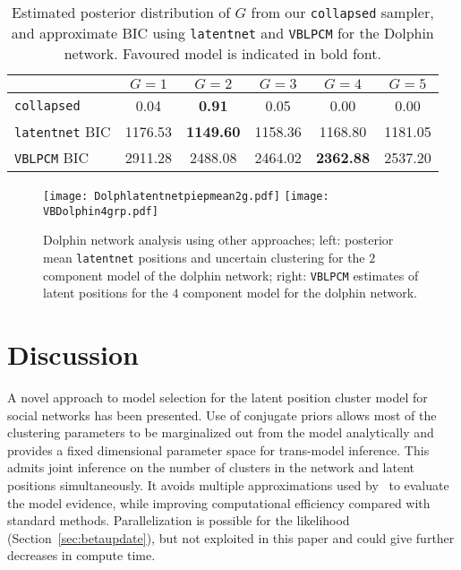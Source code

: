 \documentclass[12pt]{article}
\begin{document}
\begin{table}[htp]
\begin{center}
\begin{tabular}{| l|c|c|c|c|c|}
\hline
 & $G=1$ & $G=2$ & $G=3$ & $G=4$ & $G=5$ \\
\hline
	\texttt{collapsed} & 0.04 & \bf{0.91} & 0.05  &  0.00  & 0.00  \\
  \texttt{latentnet} BIC & 1176.53 & \bf{1149.60} & 1158.36 & 1168.80 & 1181.05  \\ 
  \texttt{VBLPCM} BIC & 2911.28  &  2488.08  & 2464.02  & \bf{2362.88} & 2537.20 \\ 
  \hline
\end{tabular}
\caption{Estimated posterior distribution of $G$ from our \texttt{collapsed} sampler, and approximate BIC using \texttt{latentnet} and \texttt{VBLPCM} for the Dolphin network. Favoured model is indicated in bold font.}
\label{tab:palldolph}
\end{center}
\end{table}


\begin{figure}[htp]
 \centering
\texttt{[image: Dolphlatentnetpiepmean2g.pdf]}
\texttt{[image: VBDolphin4grp.pdf]}
\caption{Dolphin network analysis using other approaches; left: posterior mean \texttt{latentnet} positions and uncertain clustering for the $2$ component model of the dolphin network; right: \texttt{VBLPCM} estimates of latent positions for the $4$ component model for the dolphin network.}
\label{fig:lnetdolph}
\end{figure}


\section{Discussion} \label{discussion}
A novel approach to model selection for the latent position cluster model for social networks has been presented. 
Use of conjugate priors allows most of the clustering parameters to be marginalized out from the model analytically and provides a fixed dimensional parameter space for trans-model inference. 
This admits joint inference on the number of clusters in the network and latent positions simultaneously. It avoids multiple approximations used by~ to evaluate the model evidence,
while improving computational efficiency compared with standard methods.
Parallelization is possible for the likelihood (Section~\ref{sec:betaupdate}), but not exploited in this paper and could give further
decreases in compute time.
\end{document}
